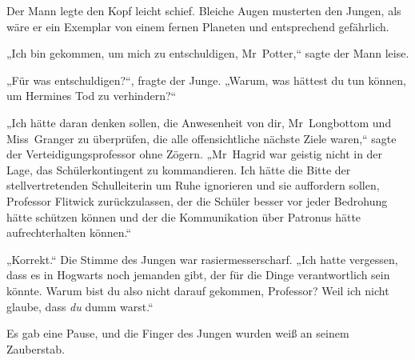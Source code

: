 Der Mann legte den Kopf leicht schief. Bleiche Augen musterten den Jungen, als wäre er ein Exemplar von einem fernen Planeten und entsprechend gefährlich.

„Ich bin gekommen, um mich zu entschuldigen, Mr~Potter,“ sagte der Mann leise.

„Für was entschuldigen?“, fragte der Junge. „Warum, was hättest du tun können, um Hermines Tod zu verhindern?“

„Ich hätte daran denken sollen, die Anwesenheit von dir, Mr~Longbottom und Miss~Granger zu überprüfen, die alle offensichtliche nächste Ziele waren,“ sagte der Verteidigungsprofessor ohne Zögern. „Mr~Hagrid war geistig nicht in der Lage, das Schülerkontingent zu kommandieren. Ich hätte die Bitte der stellvertretenden Schulleiterin um Ruhe ignorieren und sie auffordern sollen, Professor Flitwick zurückzulassen, der die Schüler besser vor jeder Bedrohung hätte schützen können und der die Kommunikation über Patronus hätte aufrechterhalten können.“

„Korrekt.“ Die Stimme des Jungen war rasiermesserscharf. „Ich hatte vergessen, dass es in Hogwarts noch jemanden gibt, der für die Dinge verantwortlich sein könnte. Warum bist du also nicht darauf gekommen, Professor? Weil ich nicht glaube, dass \emph{du} dumm warst.“

Es gab eine Pause, und die Finger des Jungen wurden weiß an seinem Zauberstab.

